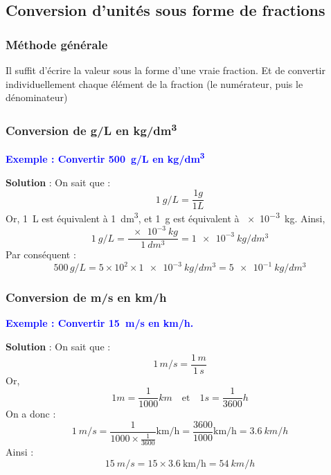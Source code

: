 \documentclass[a4paper,12pt]{article}
\begin{document}
\subsection{Conversion d'unités sous forme de fractions}

\subsubsection{Méthode générale}

\begin{tcolorbox}[colback=red!10!white, colframe=red!75!black, title=PAR COEUR]
  Il suffit d'écrire la valeur sous la forme d'une vraie fraction. Et de convertir individuellement chaque élément de la fraction (le numérateur, puis le dénominateur)
\end{tcolorbox}

\subsubsection{Conversion de \si{g/L} en \si{kg/dm^3}}

\textcolor{blue}{\textbf{Exemple : Convertir \SI{500}{g/L} en \si{kg/dm^3}}}

\vspace{1em}
\textbf{Solution} :
\vspace{1em}
On sait que :
\[
\SI{1}{g/L} = \frac{\si{1}{g}}{\si{1}{L}}
\]
Or, \SI{1}{L} est équivalent à \SI{1}{dm^3}, et \SI{1}{g} est équivalent à \SI{e-3}{kg}. Ainsi,
\[
  \SI{1}{g/L} = \frac{\SI{e-3}{kg}}{\SI{1}{dm^3}} = \SI{1e-3}{kg/dm^3}
\]
Par conséquent :
\[
500 \, \si{g/L} = 5 \times 10^2 \times \SI{1e-3}{kg/dm^3} = \SI{5e-1}{kg/dm^3}
\]

\subsubsection{Conversion de \si{m/s} en \si{km/h}}

\textcolor{blue}{\textbf{Exemple : Convertir \SI{15}{m/s} en \si{\km/h}.}}

\vspace{1em}

\textbf{Solution} : On sait que : \\

\[
1 \, \si{m/s} = \frac{1 \, \si{m}}{1 \, \si{s}}
\]
Or, 
\[
1 m = \frac{1}{1000} km \quad \text{et} \quad 1 s = \frac{1}{3600} h 
\]
On a donc :
\[
  \SI{1}{m/s} = \frac{1}{1000 \times \frac{1}{3600}} \text{km/h} = \frac{3600}{1000} \text{km/h} = \SI{3.6}{km/h}
\]
Ainsi :
\[
  \SI{15}{m/s} = 15 \times 3.6 ~\text{km/h} = \SI{54}{km/h}
\]
\end{document}
